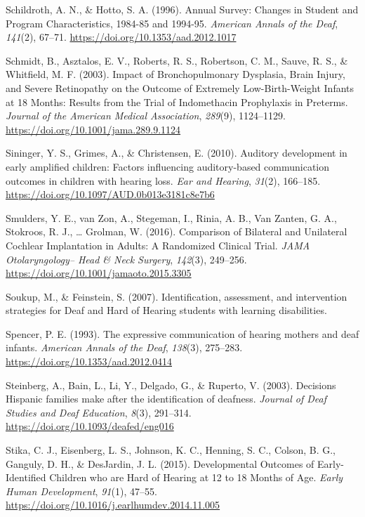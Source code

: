 \documentclass[english,man]{apa6}
\begin{document}
\leavevmode\hypertarget{ref-schildroth1996}{}%
Schildroth, A. N., \& Hotto, S. A. (1996). Annual Survey: Changes in Student and Program Characteristics, 1984-85 and 1994-95. \emph{American Annals of the Deaf}, \emph{141}(2), 67--71. \url{https://doi.org/10.1353/aad.2012.1017}

\leavevmode\hypertarget{ref-schmidt2003}{}%
Schmidt, B., Asztalos, E. V., Roberts, R. S., Robertson, C. M., Sauve, R. S., \& Whitfield, M. F. (2003). Impact of Bronchopulmonary Dysplasia, Brain Injury, and Severe Retinopathy on the Outcome of Extremely Low-Birth-Weight Infants at 18 Months: Results from the Trial of Indomethacin Prophylaxis in Preterms. \emph{Journal of the American Medical Association}, \emph{289}(9), 1124--1129. \url{https://doi.org/10.1001/jama.289.9.1124}

\leavevmode\hypertarget{ref-sininger2010}{}%
Sininger, Y. S., Grimes, A., \& Christensen, E. (2010). Auditory development in early amplified children: Factors influencing auditory-based communication outcomes in children with hearing loss. \emph{Ear and Hearing}, \emph{31}(2), 166--185. \url{https://doi.org/10.1097/AUD.0b013e3181c8e7b6}

\leavevmode\hypertarget{ref-smulders2016}{}%
Smulders, Y. E., van Zon, A., Stegeman, I., Rinia, A. B., Van Zanten, G. A., Stokroos, R. J., \ldots{} Grolman, W. (2016). Comparison of Bilateral and Unilateral Cochlear Implantation in Adults: A Randomized Clinical Trial. \emph{JAMA Otolaryngology-- Head \& Neck Surgery}, \emph{142}(3), 249--256. \url{https://doi.org/10.1001/jamaoto.2015.3305}

\leavevmode\hypertarget{ref-soukup2007}{}%
Soukup, M., \& Feinstein, S. (2007). Identification, assessment, and intervention strategies for Deaf and Hard of Hearing students with learning disabilities.

\leavevmode\hypertarget{ref-spencer1993}{}%
Spencer, P. E. (1993). The expressive communication of hearing mothers and deaf infants. \emph{American Annals of the Deaf}, \emph{138}(3), 275--283. \url{https://doi.org/10.1353/aad.2012.0414}

\leavevmode\hypertarget{ref-steinberg2003}{}%
Steinberg, A., Bain, L., Li, Y., Delgado, G., \& Ruperto, V. (2003). Decisions Hispanic families make after the identification of deafness. \emph{Journal of Deaf Studies and Deaf Education}, \emph{8}(3), 291--314. \url{https://doi.org/10.1093/deafed/eng016}

\leavevmode\hypertarget{ref-stika2015}{}%
Stika, C. J., Eisenberg, L. S., Johnson, K. C., Henning, S. C., Colson, B. G., Ganguly, D. H., \& DesJardin, J. L. (2015). Developmental Outcomes of Early-Identified Children who are Hard of Hearing at 12 to 18 Months of Age. \emph{Early Human Development}, \emph{91}(1), 47--55. \url{https://doi.org/10.1016/j.earlhumdev.2014.11.005}
\end{document}

